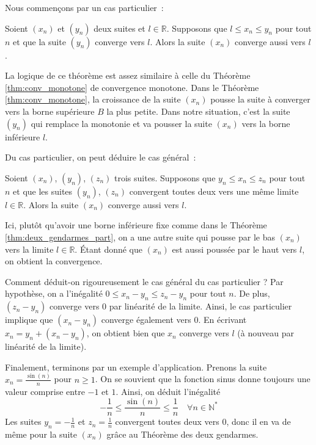 Nous commençons par un cas particulier~:
\begin{boxthm}
Soient $(x_n)$ et $(y_n)$ deux suites et $l \in \mathbb R$. Supposons que $l \leq x_n \leq y_n$ pour tout $n$ et que la suite $(y_n)$ converge vers $l$. Alors la suite $(x_n)$ converge aussi vers $l$.
\label{thm:deux_gendarmes_part}
\end{boxthm}

La logique de ce théorème est assez similaire à celle du Théorème \ref{thm:conv_monotone} de convergence monotone. Dans le Théorème  \ref{thm:conv_monotone}, la croissance de la suite $(x_n)$ pousse la suite à converger vers la borne supérieure $B$ la plus petite. Dans notre situation, c'est la suite $(y_n)$ qui remplace la monotonie et va pousser la suite $(x_n)$ vers la borne inférieure $l$.

Du cas particulier, on peut déduire le cas général~:
\begin{boxthm}
Soient $(x_n)$, $(y_n)$, $(z_n)$ trois suites. Supposons que $y_n \leq x_n \leq z_n$ pour tout $n$ et que les suites $(y_n)$, $(z_n)$ convergent toutes deux vers une même limite $l \in \mathbb R$. Alors la suite $(x_n)$ converge aussi vers $l$.
\end{boxthm}

Ici, plutôt qu'avoir une borne inférieure fixe comme dans le Théorème \ref{thm:deux_gendarmes_part}, on a une autre suite qui pousse par le bas $(x_n)$ vers la limite $l \in \mathbb R$. Étant donné que $(x_n)$ est aussi poussée par le haut vers $l$, on obtient la convergence.

Comment déduit-on rigoureusement le cas général du cas particulier ? Par hypothèse, on a l'inégalité $0 \leq x_n - y_n \leq z_n - y_n$ pour tout $n$. De plus, $(z_n - y_n)$ converge vers $0$ par linéarité de la limite. Ainsi, le cas particulier implique que $(x_n - y_n)$ converge également vers $0$. En écrivant $x_n = y_n + (x_n - y_n)$, on obtient bien que $x_n$ converge vers $l$ (à nouveau par linéarité de la limite).

Finalement, terminons par un exemple d'application. Prenons la suite $x_n = \frac{\sin(n)}{n}$ pour $n \geq 1$. On se souvient que la fonction sinus donne toujours une valeur comprise entre $-1$ et $1$. Ainsi, on déduit l'inégalité
\[
-\frac{1}{n} \leq \frac{\sin(n)}{n} \leq \frac{1}{n} \quad \forall n \in \mathbb N^*
\]
Les suites $y_n = -\frac{1}{n}$ et $z_n = \frac{1}{n}$ convergent toutes deux vers $0$, donc il en va de même pour la suite $(x_n)$ grâce au Théorème des deux gendarmes.

